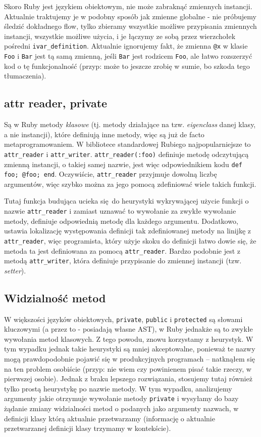 \documentclass[declaration,shortabstract]{iithesis}
\begin{document}
Skoro Ruby jest językiem obiektowym, nie może zabraknąć zmiennych instancji. Aktualnie traktujemy je w podobny sposób jak zmienne globalne - nie próbujemy śledzić dokładnego flow, tylko zbieramy wszystkie możliwe przypisania zmiennych instancji, wszystkie możliwe użycia, i je łączymy ze sobą przez wierzchołek pośredni \texttt{ivar\_definition}. Aktualnie ignorujemy fakt, że zmienna \texttt{@x} w klasie \texttt{Foo} i \texttt{Bar} jest tą samą zmienną, jeśli \texttt{Bar} jest rodzicem \texttt{Foo}, ale łatwo rozszerzyć kod o tę funkcjonalność (przyp: może to jeszcze zrobię w sumie, bo szkoda tego tłumaczenia).


\subsection{attr reader, private}

Są w Ruby metody \textit{klasowe} (tj. metody działające na tzw. \textit{eigenclass} danej klasy, a nie instancji), które definiują inne metody, więc są już de facto metaprogramowaniem.
W bibliotece standardowej Rubiego najpopularniejsze to \texttt{attr\_reader} i \texttt{attr\_writer}.
\texttt{attr\_reader(:foo)} definiuje metodę odczytującą zmienną instancji, o takiej samej nazwie, jest więc odpowiednikiem kodu \texttt{def foo; @foo; end}. Oczywiście, \texttt{attr\_reader} przyjmuje dowolną liczbę argumentów, więc szybko można za jego pomocą zdefiniować wiele takich funkcji.

Tutaj funkcja budująca ucieka się do heurystyki wykrywającej użycie funkcji o nazwie \texttt{attr\_reader} i zamiast uznawać to wywołanie za zwykłe wywołanie metody, definiuje odpowiednią metodę dla każdego argumentu. Dodatkowo, ustawia lokalizację występowania definicji tak zdefiniowanej metody na linijkę z \texttt{attr\_reader}, więc programista, który użyje skoku do definicji łatwo dowie się, że metoda ta jest definiowana za pomocą \texttt{attr\_reader}. Bardzo podobnie jest z metodą \texttt{attr\_writer}, która definiuje przypisanie do zmiennej instancji (tzw. \textit{setter}).

\subsection{Widzialność metod}

W większości języków obiektowych, \texttt{private}, \texttt{public} i \texttt{protected} są słowami kluczowymi (a przez to - posiadają własne AST), w Ruby jednakże są to zwykłe wywołania metod klasowych. Z tego powodu, znowu korzystamy z heurystyk. W tym wypadku jednak takie heurystyki są mniej akceptowalne, ponieważ te nazwy mogą prawdopodobnie pojawić się w produkcyjnych programach -- natknąłem się na ten problem osobiście (przyp: nie wiem czy powinienem pisać takie rzeczy, w pierwszej osobie). Jednak z braku lepszego rozwiązania, stosujemy tutaj również tylko prostą heurystykę po nazwie metody. W tym wypadku, analizujemy argumenty jakie otrzymuje wywołanie metody \texttt{private} i wysyłamy do bazy żądanie zmiany widzialności metod o podanych jako argumenty nazwach, w definicji klasy którą aktualnie przetwarzamy (informację o aktualnie przetwarzanej definicji klasy trzymamy w kontekście).
\end{document}
